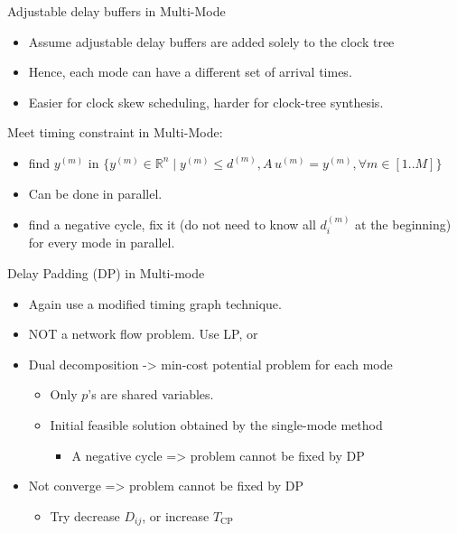 \documentclass[10pt,ignorenonframetext,mathserif]{beamer}
\providecommand{\tightlist}{%
  \setlength{\itemsep}{0pt}\setlength{\parskip}{0pt}}
\begin{document}
\begin{frame}{Adjustable delay buffers in Multi-Mode}

\begin{itemize}
\tightlist
\item
  Assume adjustable delay buffers are added solely to the clock tree
\item
  Hence, each mode can have a different set of arrival times.
\item
  Easier for clock skew scheduling, harder for clock-tree synthesis.
\end{itemize}

\end{frame}

\begin{frame}{Meet timing constraint in Multi-Mode:}

\begin{itemize}
\tightlist
\item
  find \(y^{(m)}\) in
  \(\{y^{(m)} \in \mathbb{R}^n \mid y^{(m)} \leq d^{(m)}, A\,u^{(m)} = y^{(m)}, \forall m\in[1..M]\}\)
\item
  Can be done in parallel.
\item
  find a negative cycle, fix it (do not need to know all \(d_i^{(m)}\)
  at the beginning) for every mode in parallel.
\end{itemize}

\end{frame}

\begin{frame}{Delay Padding (DP) in Multi-mode}

\begin{itemize}
\tightlist
\item
  Again use a modified timing graph technique.
\item
  NOT a network flow problem. Use LP, or
\item
  Dual decomposition -\textgreater{} min-cost potential problem for each
  mode

  \begin{itemize}
  \tightlist
  \item
    Only \(p\)'s are shared variables.
  \item
    Initial feasible solution obtained by the single-mode method

    \begin{itemize}
    \tightlist
    \item
      A negative cycle =\textgreater{} problem cannot be fixed by DP
    \end{itemize}
  \end{itemize}
\item
  Not converge =\textgreater{} problem cannot be fixed by DP

  \begin{itemize}
  \tightlist
  \item
    Try decrease \(D_{ij}\), or increase \(T_\text{CP}\)
  \end{itemize}
\end{itemize}

\end{frame}
\end{document}
